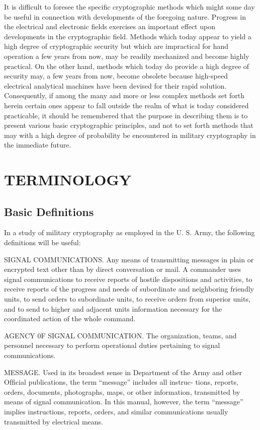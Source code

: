 \mypara It is difficult to foresee the speciﬁc cryptographic methods which
might some day be useful in connection with developments of the foregoing nature. Progress in the electrical and electronic ﬁelds exercises an
important effect upon developments in the cryptographic ﬁeld. Methods
which today appear to yield a high degree of cryptographic security but
which are impractical for hand operation a few years from now, may be
readily mechanized and become highly practical. On the other hand,
methods which today do provide a high degree of security may, a few
years from now, become obsolete because high-speed electrical analytical
machines have been devised for their rapid solution. Consequently, if
among the many and more or less complex methods set forth herein
certain ones appear to fall outside the realm of what is today considered
practicable, it should be remembered that the purpose in describing them
is to present various basic cryptographic principles, and not to set forth
methods that may with a high degree of probability be encountered in
military cryptography in the immediate future.

\section{TERMINOLOGY}

\subsection{Basic Definitions}

In a study of military cryptography as employed in the U. S. Army,
the following deﬁnitions will be useful:

\mypara SIGNAL COMMUNICATIONS. Any means of transmitting messages
in plain or encrypted text other than by direct conversation or mail. A
commander uses signal communications to receive reports of hostile
dispositions and activities, to receive reports of the progress and needs
of subordinate and neighboring friendly units, to send orders to subordinate units, to receive orders from superior units, and to send to higher
and adjacent units information necessary for the coordinated action of
the whole command.

\mypara AGENCY 0F SIGNAL COMMUNICATION. The organization, teams, and
personnel necessary to perform operational duties pertaining to signal
communications.

\mypara MESSAGE. Used in its broadest sense in Department of the Army
and other Ofﬁcial publications, the term “message” includes all instruc-
tions, reports, orders, documents, photographs, maps, or other information, transmitted by means of signal communication. In this manual,
however, the term “message” implies instructions, reports, orders, and
similar communications usually transmitted by electrical means.

